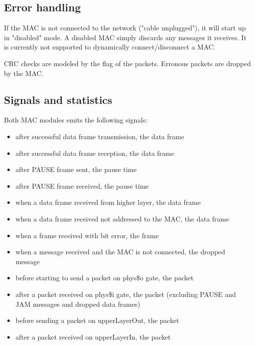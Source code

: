 \subsection*{Error handling}

If the MAC is not connected to the network ("cable unplugged"), it will
start up in "disabled" mode. A disabled MAC simply discards any messages
it receives. It is currently not supported to dynamically connect/disconnect
a MAC.

CRC checks are modeled by the  flag of the packets. Erronous
packets are dropped by the MAC.

\subsection*{Signals and statistics}

Both MAC modules emits the following signals:
\begin{itemize}
  \item {} after successful data frame transmission, the data frame
  \item {} after successful data frame reception, the data frame
  \item {} after PAUSE frame sent, the pause time
  \item {} after PAUSE frame received, the pause time
  \item {} when a data frame received from higher layer,
         the data frame
  \item {} when a data frame received not addressed
         to the MAC, the data frame
  \item {} when a frame received with bit error, the frame
  \item {} when a message received and the MAC is not connected,
        the dropped message
  \item {} before starting to send a packet on phys\$o gate,
        the packet
  \item {} after a packet received on phys\$i gate,
        the packet (excluding PAUSE and JAM messages and dropped data frames)
  \item {} before sending a packet on upperLayerOut, the packet
  \item {} after a packet received on upperLayerIn,
        the packet
\end{itemize}

